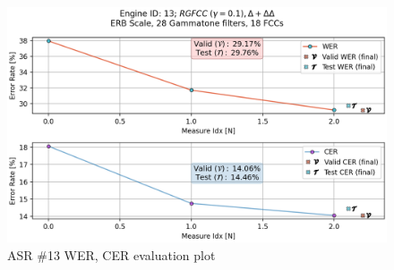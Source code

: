 \begin{figure}[H]
    \centering
    \includegraphics[width=0.95\linewidth]{ASR/images/asr13_wer.png}
    \caption{ASR \#13 WER, CER evaluation plot}\label{fig:wer_13}
\end{figure}












